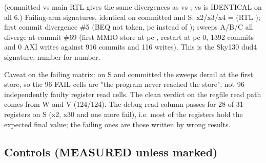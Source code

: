 \begin{record}
\begin{landscape}
\end{landscape}

(committed vs main RTL gives the same divergences as vs ;
 vs  is IDENTICAL on all 6.) Failing-arm
signatures, identical on committed and S:  x2/x3/x4 =
 (RTL ); 
first commit divergence \#5 (BEQ not taken, pc  instead of
); sweeps A/B/C all diverge at commit \#69 (first MMIO store
at pc , restart at pc 0, 1392 commits and 0 AXI writes
against 916 commits and 116 writes). This is the Sky130 dud4 signature,
number for number.

Caveat on the failing matrix: on S and committed the sweeps derail at
the first store, so the 96 FAIL cells are "the program never reached the
store", not 96 independently faulty register read cells. The clean
verdict on the regfile read path comes from W and V
(124/\allowbreak{}124). The debug-read column passes for 28 of 31
registers on S (x2, x30 and one more fail), i.e. most of the registers
hold the expected final value; the failing ones are those written by
wrong results.

\end{record}

\subsection{Controls (MEASURED unless marked)}\label{cr:defect:asap7-cpu-synlig-ma7:controls-measured-unless-marked}

